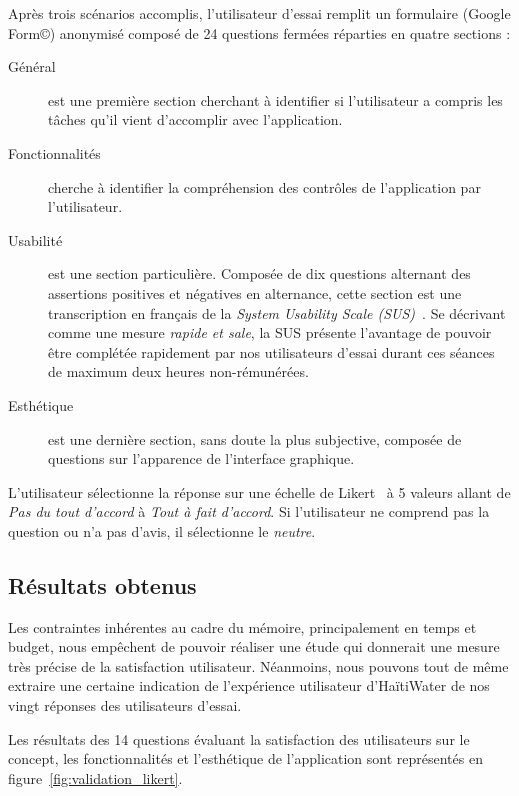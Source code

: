 \documentclass{EPL-master-thesis-covers-FR}
\begin{document}
				Après trois scénarios accomplis, l'utilisateur d'essai remplit un formulaire (Google Form\copyright) anonymisé composé de 24 questions fermées réparties en quatre sections :
				\begin{description}
					\item[Général] est une première section cherchant à identifier si l'utilisateur a compris les tâches qu'il vient d'accomplir avec l'application.
					\item[Fonctionnalités] cherche à identifier la compréhension des contrôles de l'application par l'utilisateur.
					\item[Usabilité] est une section particulière. Composée de dix questions alternant des assertions positives et négatives en alternance, cette section est une transcription en français de la \emph{System Usability Scale (SUS)}~\cite{ref:sus}. Se décrivant comme une mesure \emph{rapide et sale}, la SUS présente l'avantage de pouvoir être complétée rapidement par nos utilisateurs d'essai durant ces séances de maximum deux heures non-rémunérées.
					\item[Esthétique] est une dernière section, sans doute la plus subjective, composée de questions sur l'apparence de l'interface graphique.
				\end{description}

				L'utilisateur sélectionne la réponse sur une échelle de Likert~\cite{ref:wikipedia_likert_scale} à 5 valeurs allant de \emph{Pas du tout d'accord} à \emph{Tout à fait d'accord}. Si l'utilisateur ne comprend pas la question ou n'a pas d'avis, il sélectionne le \emph{neutre}.

			\subsection*{Résultats obtenus}

				Les contraintes inhérentes au cadre du mémoire, principalement en temps et budget, nous empêchent de pouvoir réaliser une étude qui donnerait une mesure très précise de la satisfaction utilisateur. Néanmoins, nous pouvons tout de même extraire une certaine indication de l'expérience utilisateur d'HaïtiWater de nos vingt réponses des utilisateurs d'essai.

				Les résultats des 14 questions évaluant la satisfaction des utilisateurs sur le concept, les fonctionnalités et l'esthétique de l'application sont représentés en figure~\ref{fig:validation_likert}.
\end{document}
